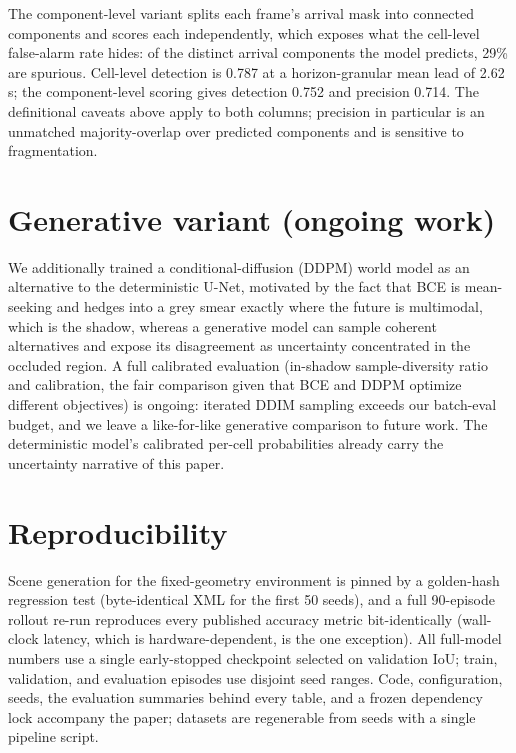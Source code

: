 \documentclass{article}
\begin{document}
The component-level variant splits each frame's arrival mask into connected components and
scores each independently, which exposes what the cell-level false-alarm rate hides: of the
distinct arrival components the model predicts, 29\% are spurious. Cell-level detection is 0.787
at a horizon-granular mean lead of 2.62\,s; the component-level scoring gives detection 0.752 and
precision 0.714. The definitional caveats above apply to both columns; precision in particular is
an unmatched majority-overlap over predicted components and is sensitive to fragmentation.

\section{Generative variant (ongoing work)}
\label{app:generative}

We additionally trained a conditional-diffusion (DDPM) world model as an alternative to the
deterministic U-Net, motivated by the fact that BCE is mean-seeking and hedges into a grey smear
exactly where the future is multimodal, which is the shadow, whereas a generative model can sample
coherent alternatives and expose its disagreement as uncertainty concentrated in the occluded
region. A full calibrated evaluation (in-shadow sample-diversity ratio and calibration, the fair
comparison given that BCE and DDPM optimize different objectives) is ongoing: iterated DDIM
sampling exceeds our batch-eval budget, and we leave a like-for-like generative comparison to
future work. The deterministic model's calibrated per-cell probabilities already carry the
uncertainty narrative of this paper.

\section{Reproducibility}
\label{app:repro}

Scene generation for the fixed-geometry environment is pinned by a golden-hash regression test
(byte-identical XML for the first 50 seeds), and a full 90-episode rollout re-run reproduces
every published accuracy metric bit-identically (wall-clock latency, which is
hardware-dependent, is the one exception). All full-model numbers use a single early-stopped
checkpoint selected on validation IoU; train, validation, and evaluation episodes use disjoint
seed ranges. Code, configuration, seeds, the evaluation summaries behind every table, and a
frozen dependency lock accompany the paper; datasets are regenerable from seeds with a single
pipeline script.
\end{document}
